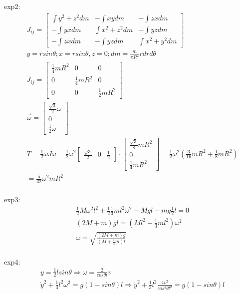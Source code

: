 \documentclass{article}
\begin{document}
exp2:
\begin{align*}
&J_{ij}=\begin{bmatrix}
  \int y^2+z^2dm&-\int xy dm&-\int zx dm\\
  -\int yxdm&\int x^2+z^2 dm&-\int yzdm\\
  -\int zx dm&-\int yz dm&\int x^2+y^2 dm
\end{bmatrix}\\
&y=rsin\theta;x=rsin\theta,z=0;dm=\frac{m}{\pi R^2}rdrd\theta \\
&J_{ij}=\begin{bmatrix}
  \frac14mR^2&0&0\\
  0&\frac14mR^2&0\\
  0&0&\frac12mR^2
\end{bmatrix}\\
&\vec \omega=\begin{bmatrix}\frac{\sqrt{3}}2\omega\\0\\\frac12\omega\end{bmatrix} \\
&T=\frac12\omega J\omega=\frac12 \omega^2 \begin{bmatrix}\frac{\sqrt{3}}2&0&\frac12\end{bmatrix}\cdot\begin{bmatrix}\frac{\sqrt{3}}8mR^2\\0\\\frac14mR^2\end{bmatrix}=\frac12\omega^2(\frac3{16}mR^2+\frac18mR^2) \\
&=\frac5{32}\omega^2mR^2 \\
\end{align*}

exp3:
\begin{align*}
&\frac12M\omega^2l^2+\frac12\frac13ml^2\omega^2-Mgl-mg\frac12l=0 \\
&(2M+m)gl=(Ml^2+\frac13ml^2)\omega^2 \\
&\omega=\sqrt{\frac{(2M+m)g}{(M+\frac13m)l}} \\
\end{align*}

exp4:
\begin{align*}
&y=\frac12lsin\theta\Rightarrow \omega =\frac2{cos\theta l}v \\
&\dot y^2+\frac13l^2\omega^2=g(1-sin\theta)l\Rightarrow \dot y^2+\frac13l^2 \frac{4v^2}{cos^2\theta l^2}=g(1-sin\theta )l \\
\end{align*}
\end{document}
